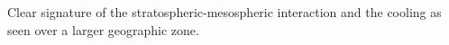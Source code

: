 Clear signature of the stratospheric-mesospheric interaction and the cooling as seen over a larger geographic zone.
